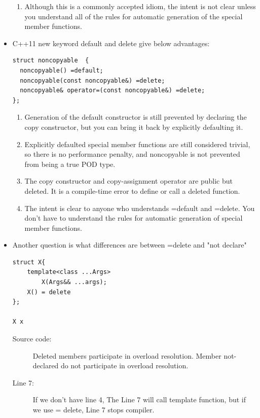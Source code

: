 \documentclass[a4paper,11pt,twoside]{book}
\begin{document}
\begin{itemize}
\begin{enumerate}
	\item Although this is a commonly accepted idiom, the intent is not clear unless you understand all of the rules for automatic generation of the special member functions.
\end{enumerate}


\item C++11 new keyword default and delete give below advantages:
\begin{lstlisting}[numbers=none]
struct noncopyable  {
  noncopyable() =default;
  noncopyable(const noncopyable&) =delete;
  noncopyable& operator=(const noncopyable&) =delete;
};
\end{lstlisting}

\begin{enumerate}
	\item Generation of the default constructor is still prevented by declaring the copy constructor, but you can bring it back by explicitly defaulting it.

	\item Explicitly defaulted special member functions are still considered trivial, so there is no performance penalty, and noncopyable is not prevented from being a true POD type.

	\item The copy constructor and copy-assignment operator are public but deleted. It is a compile-time error to define or call a deleted function.

	\item The intent is clear to anyone who understands =default and =delete. You don't have to understand the rules for automatic generation of special member functions.
\end{enumerate}

	\item Another question is what differences are between =delete and "not declare"
\begin{lstlisting}
struct X{
	template<class ...Args>
		X(Args&& ...args);
	X() = delete
};

X x 
\end{lstlisting}
\begin{description}
	\item[Source code:] Deleted members participate in overload resolution. Member not-declared do not participate in overload resolution.	
	\item[Line 7:] If we don't have line 4, The Line 7 will call template function, but if we use = delete, Line 7 stops compiler.  
\end{description}


\end{itemize}
\end{document}
